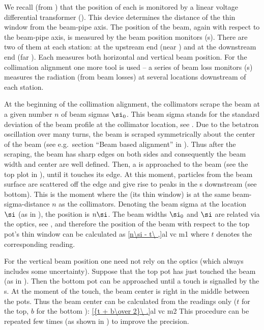 We recall (from ) that the position of each  is monitored by a linear voltage differential transformer (). This device determines the distance of the thin window from the beam-pipe axis. The position of the beam, again with respect to the beam-pipe axis, is measured by the beam position monitors (s). There are two of them at each station: at the upstream end (near ) and at the downstream end (far ). Each  measures both horizontal and vertical beam position. For the collimation alignment one more tool is used -- a series of beam loss monitors (s) measures the radiation (from beam losses) at several locations downstream of each station.

At the beginning of the collimation alignment, the collimators scrape the beam at a given number $n$ of beam sigmas $\si_0$. This beam sigma stands for the standard deviation of the beam profile at the collimator location, see . Due to the betatron oscillation over many turns, the beam is scraped symmetrically about the center of the beam (see e.g.~section ``Beam based alignment'' in ). Thus after the scraping, the beam has sharp edges on both sides and consequently the beam width and center are well defined. Then, a  is approached to the beam (see the top plot in ), until it touches its edge. At this moment, particles from the beam surface are scattered off the  edge and give rise to peaks in the s downstream (see  bottom). This is the moment where the  (its thin window) is at the same beam-sigma-distance $n$ as the collimators. Denoting the beam sigma at the  location $\si$ (as in ), the  position is $n\si$. The beam widths $\si_0$ and $\si$ are related via the optics, see , and therefore the position of the beam with respect to the top pot's thin window can be calculated as
\eqref{n\si - t\ ,}{al vc m1}
where $t$ denotes the corresponding  reading.

For the vertical beam position one need not rely on the optics (which always includes some uncertainty). Suppose that the top pot has just touched the beam (as in ). Then the bottom pot can be approached until a touch is signalled by the s. At the moment of the touch, the beam center is right in the middle between the pots. Thus the beam center can be calculated from the  readings only ($t$ for the top, $b$ for the bottom ):
\eqref{{t + b\over 2}\ .}{al vc m2}
This procedure can be repeated few times (as shown in ) to improve the precision.

